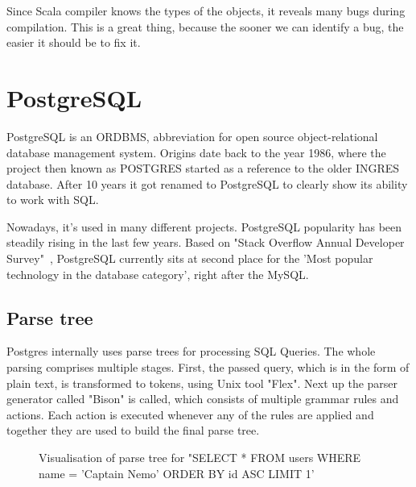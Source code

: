 \documentclass[thesis=B,english]{FITthesis}[2019/12/23]
\begin{document}
Since Scala compiler knows the types of the objects, it reveals many bugs during compilation. This is a great thing, because the sooner we can identify a bug, the easier it should be to fix it. 

\newpage
\section{PostgreSQL}
PostgreSQL is an ORDBMS, abbreviation for open source object-relational database management system.\cite{PostgreSQL} Origins date back to the year 1986, where the project then known as POSTGRES started as a reference to the older INGRES database. After 10 years it got renamed to PostgreSQL to clearly show its ability to work with SQL. 

Nowadays, it's used in many different projects. PostgreSQL popularity has been steadily rising in the last few years. Based on "Stack Overflow Annual Developer Survey"~\cite{Stackoverflow survey}, PostgreSQL currently sits at second place for the 'Most popular technology in the database category', right after the MySQL.

\subsection{Parse tree}
Postgres internally uses parse trees for processing SQL Queries. The whole parsing comprises multiple stages. First, the passed query, which is in the form of plain text, is transformed to tokens, using Unix tool "Flex". Next up the parser generator called "Bison" is called, which consists of multiple grammar rules and actions. Each action is executed whenever any of the rules are applied and together they are used to build the final parse tree.
\newline

\begin{figure}[h]
  \caption {Visualisation of parse tree for "SELECT * FROM users WHERE name = 'Captain Nemo' ORDER BY id ASC LIMIT 1'}
\end{figure}
\end{document}

